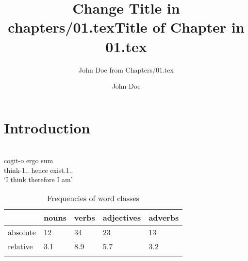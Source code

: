 \documentclass[output=paper]{LSP/langsci}
\author{John Doe from Chapters/01.tex}
\title{Change {T}itle in chapters/01.tex}
\author{John Doe}
\title{Title of Chapter in 01.tex}
\begin{document}
\section{Introduction} 
 
 \citet{Chomsky1957}
\ea\label{ex:1:descartes}
\\
\gll cogit-o ergo sum \\
     think-1{\sg}.{\prs}.{\ind} hence exist.1{\sg}.{\prs}.{\ind}\\
\glt `I think therefore I am'
\z

\begin{table}
\caption{Frequencies of word classes}
\label{tab:1:frequencies}
 \begin{tabular}{lllll} %
  \lsptoprule
            & nouns & verbs & adjectives & adverbs\\ %
  \midrule
  absolute  &   12 &    34  &    23     & 13\\
  relative  &   3.1 &   8.9 &    5.7    & 3.2\\
  \lspbottomrule
 \end{tabular}
\end{table}

 


\printbibliography[heading=subbibliography,notkeyword=this]
\end{document}
